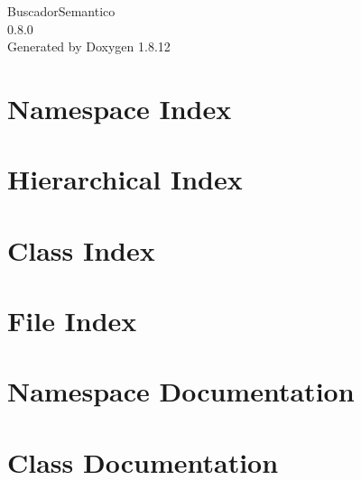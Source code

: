 \documentclass[twoside]{book}
\newcommand{\+}{\discretionary{\mbox{\scriptsize$\hookleftarrow$}}{}{}}
\newcommand{\clearemptydoublepage}{%
  \newpage{\pagestyle{empty}\cleardoublepage}%
}
\begin{document}
\hypersetup{pageanchor=false,
             bookmarksnumbered=true,
             pdfencoding=unicode
            }
\begin{titlepage}
\vspace*{7cm}
\begin{center}%
{\Large Buscador\+Semantico \\[1ex]\large 0.\+8.\+0 }\\
\vspace*{1cm}
{\large Generated by Doxygen 1.8.12}\\
\end{center}
\end{titlepage}
\clearemptydoublepage
{}
\tableofcontents
\clearemptydoublepage
{}
\hypersetup{pageanchor=true}

\chapter{Namespace Index}

\chapter{Hierarchical Index}

\chapter{Class Index}

\chapter{File Index}

\chapter{Namespace Documentation}







\chapter{Class Documentation}























\end{document}
